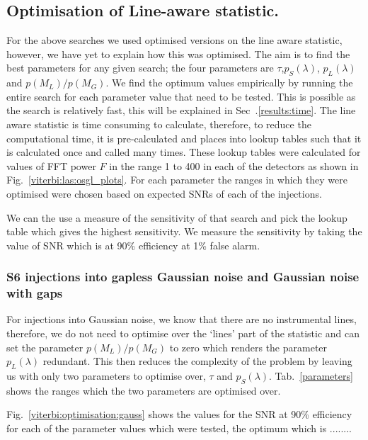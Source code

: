 \subsection{\label{viterbi:las:optimisation}Optimisation of Line-aware statistic.}

For the above searches we used optimised versions on the line aware statistic, however, we have yet to explain how this was optimised. 
The aim is to find the best parameters for any given search; the four parameters are $\tau$,$p_S(\lambda)$, $p_L(\lambda)$ and $p(M_L)/p(M_G)$.
We find the optimum values empirically by running the entire search for each parameter value that need to be tested. This is possible as the search is relatively fast, this will be explained in Sec~.\ref{results:time}. 
The line aware statistic is time consuming to calculate, therefore, to reduce the computational time, it is pre-calculated and places into lookup tables such that it is calculated once and called many times. 
These lookup tables were calculated for values of \ac{FFT} power $F$ in the range 1 to 400 in each of the detectors as shown in Fig.~\ref{viterbi:las:osgl_plots}. For each parameter the ranges in which they were optimised were chosen based on expected \acp{SNR} of each of the injections. 

We can the use a measure of the sensitivity of that search and pick the lookup table which gives the highest sensitivity. 
We measure the sensitivity by taking the value of \ac{SNR} which is at 90\% efficiency at 1\% false alarm. 

\subsubsection{S6 injections into gapless Gaussian noise and Gaussian noise with gaps}

For injections into Gaussian noise, we know that there are no instrumental lines, therefore, we do not need to optimise over the `lines' part of the statistic and can set the parameter $p(M_L)/p(M_G)$ to zero which renders the parameter $p_L(\lambda)$ redundant. 
This then reduces the complexity of the problem by leaving us with only two parameters to optimise over, $\tau$ and $p_S(\lambda)$. 
Tab.~\ref{parameters} shows the ranges which the two parameters are optimised over. 

Fig.~\ref{viterbi:optimisation:gauss} shows the values for the \ac{SNR} at 90\% efficiency for each of the parameter values which were tested, the optimum which is ........  

